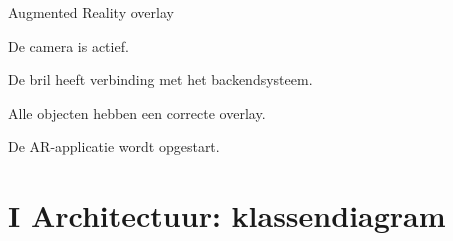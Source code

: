 \documentclass[12pt,a4paper,oneside]{article}
\begin{document}
\begin{uc}{Augmented Reality overlay}
\begin{uc-ext}
    \end{uc-ext}

    \begin{uc-pre}
	\item De camera is actief.
	\item De bril heeft verbinding met het backendsysteem.
    \end{uc-pre}

    \begin{uc-post}
	\item Alle objecten hebben een correcte overlay.
    \end{uc-post}

    \begin{uc-trig}
	\item De AR-applicatie wordt opgestart.
    \end{uc-trig}

\end{uc}
\section*{I	\;\;\;Architectuur: klassendiagram}
\setcounter{section}{0}
\end{document}
